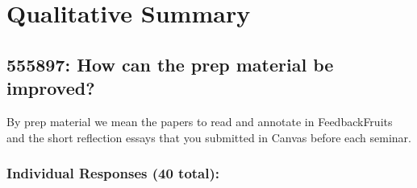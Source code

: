 \documentclass[a4paper]{report}
\begin{document}
\section{Qualitative Summary}

\subsection{555897: How can the prep material be improved?}

By prep material we mean the papers to read and annotate in FeedbackFruits and 
the short reflection essays that you submitted in Canvas before each seminar.

\subsubsection{Individual Responses (40 total):}
\end{document}

